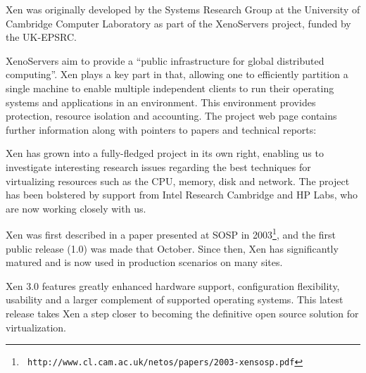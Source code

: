 Xen was originally developed by the Systems Research Group at the
University of Cambridge Computer Laboratory as part of the XenoServers
project, funded by the UK-EPSRC\@.

XenoServers aim to provide a ``public infrastructure for global
distributed computing''. Xen plays a key part in that, allowing one to
efficiently partition a single machine to enable multiple independent
clients to run their operating systems and applications in an
environment. This environment provides protection, resource isolation
and accounting. The project web page contains further information along
with pointers to papers and technical reports:

Xen has grown into a fully-fledged project in its own right, enabling us
to investigate interesting research issues regarding the best techniques
for virtualizing resources such as the CPU, memory, disk and network.
The project has been bolstered by support from Intel Research Cambridge
and HP Labs, who are now working closely with us.

Xen was first described in a paper presented at SOSP in
2003\footnote{\tt
  http://www.cl.cam.ac.uk/netos/papers/2003-xensosp.pdf}, and the first
public release (1.0) was made that October. Since then, Xen has
significantly matured and is now used in production scenarios on many
sites.

Xen 3.0 features greatly enhanced hardware support, configuration
flexibility, usability and a larger complement of supported operating
systems. This latest release takes Xen a step closer to becoming the
definitive open source solution for virtualization.
